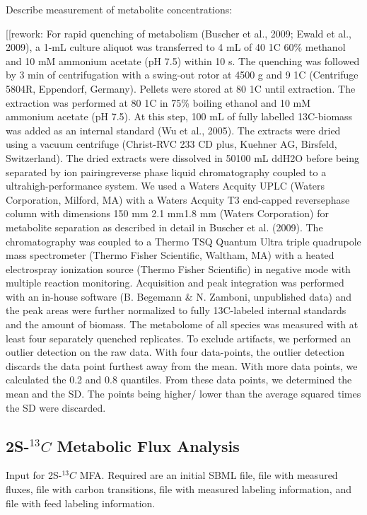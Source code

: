 \documentclass{bmcart}
\begin{document}
Describe measurement of metabolite concentrations:


[[rework: For rapid quenching of metabolism (Buscher et al., 2009;
Ewald et al., 2009), a 1-mL culture aliquot was transferred to
4 mL of  40 1C 60\% methanol and 10 mM ammonium
acetate (pH 7.5) within 10 s. The quenching was followed by
3 min of centrifugation with a swing-out rotor at 4500 g and
 9 1C (Centrifuge 5804R, Eppendorf, Germany). Pellets
were stored at  80 1C until extraction. The extraction was
performed at 80 1C in 75\% boiling ethanol and 10 mM
ammonium acetate (pH 7.5). At this step, 100 mL of fully
labelled 13C-biomass was added as an internal standard (Wu
et al., 2005). The extracts were dried using a vacuum
centrifuge (Christ-RVC 233 CD plus, Kuehner AG, Birsfeld,
Switzerland). The dried extracts were dissolved in
50100 mL ddH2O before being separated by ion pairingreverse
phase liquid chromatography coupled to a ultrahigh-performance
system.
We used a Waters Acquity UPLC (Waters Corporation,
Milford, MA) with a Waters Acquity T3 end-capped reversephase
column with dimensions 150 mm 2.1 mm1.8 mm (Waters Corporation) for metabolite separation as described
in detail in Buscher et al. (2009). The chromatography was
coupled to a Thermo TSQ Quantum Ultra triple quadrupole
mass spectrometer (Thermo Fisher Scientific, Waltham,
MA) with a heated electrospray ionization source (Thermo
Fisher Scientific) in negative mode with multiple reaction
monitoring. Acquisition and peak integration
was performed with an in-house software (B. Begemann \&
N. Zamboni, unpublished data) and the peak areas were
further normalized to fully 13C-labeled internal standards
and the amount of biomass.
The metabolome of all species was measured with at least
four separately quenched replicates. To exclude artifacts, we
performed an outlier detection on the raw data. With four
data-points, the outlier detection discards the data point
furthest away from the mean. With more data points, we
calculated the 0.2 and 0.8 quantiles. From these data points,
we determined the mean and the SD. The points being higher/
lower than the average squared times the SD were discarded.

\subsection*{2S-$^{13}C$ Metabolic Flux Analysis}
Input for 2S-$^{13}C$ MFA.
Required are an  initial SBML file, file with measured fluxes, file with  carbon transitions, file with  measured labeling information, and file with  feed labeling information.
\end{document}
